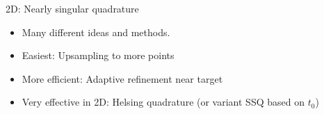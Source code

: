 \documentclass[t]{beamer}
\newcommand{\vg}{\vspace{2ex}}
\begin{document}
\begin{frame}{2D: Nearly singular quadrature}
  \begin{itemize}
  \item Many different ideas and methods.
  \item Easiest: Upsampling  to more points
  \item More efficient: Adaptive refinement near target
  \item Very effective in 2D: Helsing quadrature (or variant SSQ based on $t_0$)
  \end{itemize}  
  \vg
  
  \begin{center}
    \begin{columns}[c]
      \begin{column}{0.5\textwidth}
      \end{column}
      \begin{column}{0.5\textwidth}

\end{column}
\end{columns}
\end{center}
\end{frame}
\end{document}

